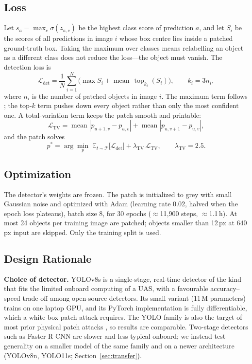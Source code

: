 \documentclass[conference]{IEEEtran}
\begin{document}
\subsection{Loss}
Let $s_a=\max_c \sigma(z_{a,c})$ be the highest class score of prediction $a$, and let
$S_i$ be the scores of all predictions in image $i$ whose box centre lies inside a patched
ground-truth box. Taking the maximum over classes means relabelling an object as a different
class does not reduce the loss---the object must vanish. The detection loss is
\begin{equation}
\mathcal{L}_{\text{det}} = \frac{1}{N}\sum_{i=1}^{N}\Big(\max S_i +
\operatorname{mean}\,\operatorname{top}_{k_i}(S_i)\Big),\qquad k_i = 3n_i,
\end{equation}
where $n_i$ is the number of patched objects in image $i$. The maximum term follows
\cite{thys2019fooling}; the top-$k$ term pushes down every object rather than only the most
confident one. A total-variation term \cite{rudin1992nonlinear,sharif2016accessorize}
keeps the patch smooth and printable:
\begin{equation}
\mathcal{L}_{\text{TV}} = \operatorname{mean}|p_{u+1,v}-p_{u,v}| + \operatorname{mean}|p_{u,v+1}-p_{u,v}|,
\end{equation}
and the patch solves
\begin{equation}
p^{*} = \arg\min_{p}\; \mathbb{E}_{t\sim\mathcal{T}}\big[\mathcal{L}_{\text{det}}\big]
+ \lambda_{\text{TV}}\,\mathcal{L}_{\text{TV}},\qquad \lambda_{\text{TV}}=2.5 .
\end{equation}

\subsection{Optimization}
The detector's weights are frozen. The patch is initialized to grey with small Gaussian noise
and optimized with Adam \cite{kingma2015adam} (learning rate 0.02, halved when the epoch loss
plateaus), batch size 8, for 30 epochs ($\approx$11{,}900 steps, $\approx$1.1\,h). At most 24
objects per training image are patched; objects smaller than 12\,px at $640$\,px input are
skipped. Only the training split is used.

\subsection{Design Rationale}
\label{sec:rationale}
\textbf{Choice of detector.} YOLOv8s is a single-stage, real-time detector of the kind that
fits the limited onboard computing of a UAS, with a favourable accuracy--speed trade-off
among open-source detectors. Its small variant (11\,M parameters) trains on one laptop GPU,
and its PyTorch implementation is fully differentiable, which a white-box patch attack
requires. The YOLO family is also the target of most prior physical patch attacks
\cite{lee2019physical,thys2019fooling,denhollander2020adversarial}, so results are comparable.
Two-stage detectors such as Faster R-CNN are slower and less typical onboard; we instead test
generality on a smaller model of the same family and on a newer architecture (YOLOv8n,
YOLO11s; Section~\ref{sec:transfer}).
\end{document}
